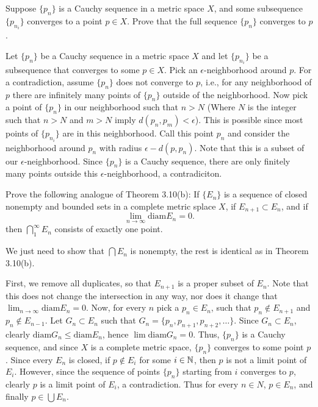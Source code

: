 \setcounter{problem}{19}
\begin{problem}
  Suppose $\{p_n\}$ is a Cauchy sequence in a metric space $X$, and some subsequence $\{p_{n_i}\}$ converges to a point $p \in X$.
  Prove that the full sequence $\{p_n\}$ converges to $p$.
\end{problem}

\begin{solution}
  Let $\{p_n\}$ be a Cauchy sequence in a metric space $X$ and let $\{p_{n_i}\}$ be a subsequence that converges to some $p \in X$.
  Pick an $\epsilon$-neighborhood around $p$.
  For a contradiction, assume $\{p_n\}$ does not converge to $p$, i.e., for any neighborhood of $p$ there are infinitely many points of $\{p_n\}$ outside of the neighborhood.
  Now pick a point of $\{p_{n}\}$ in our neighborhood such that $n > N$ (Where $N$ is the integer such that $n > N$ and $m > N$ imply $d(p_n, p_m) < \epsilon$).
  This is possible since most points of $\{p_{n_i}\}$ are in this neighborhood.
  Call this point $p_n$ and consider the neighborhood around $p_n$ with radius $\epsilon - d(p, p_n)$.
  Note that this is a subset of our $\epsilon$-neighborhood.
  Since $\{p_n\}$ is a Cauchy sequence, there are only finitely many points outside this $\epsilon$-neighborhood, a contradiciton.
\end{solution}

\begin{problem}
  Prove the following analogue of Theorem 3.10(b): If $\{E_n\}$ is a sequence of closed nonempty and bounded sets in a complete metric splace $X$, if $E_{n+1} \subset E_n$, and if 
  \[\lim_{n \to \infty} \text{diam} E_n = 0.\]
  then $\bigcap_1^{\infty} E_n$ consists of exactly one point.
\end{problem}

\begin{solution}
  We just need to show that $\bigcap E_n$ is nonempty, the rest is identical as in Theorem 3.10(b).

  First, we remove all duplicates, so that $E_{n + 1}$ is a proper subset of $E_n$.
  Note that this does not change the intersection in any way, nor does it change that $\lim_{n \to \infty} \text{diam} E_n = 0$.
  Now, for every $n$ pick a $p_n \in E_n$, such that $p_n \notin E_{n + 1}$ and $p_n \notin E_{n - 1}$.
  Let $G_n \subset E_n$ such that $G_n = \{p_n, p_{n + 1}, p_{n + 2}, \ldots\}$.
  Since $G_n \subset E_n$, clearly $\text{diam} G_n \le \text{diam} E_n$, hence $\lim \text{diam} G_n = 0$.
  Thus, $\{p_n\}$ is a Cauchy sequence, and since $X$ is a complete metric space, $\{p_n\}$ converges to some point $p$.
  Since every $E_n$ is closed, if $p \notin E_i$ for some $i \in \mathbb{N}$, then $p$ is not a limit point of $E_i$.
  However, since the sequence of points $\{p_n\}$ starting from $i$ converges to $p$, clearly $p$ is a limit point of $E_i$, a contradiction.
  Thus for every $n \in N$, $p \in E_n$, and finally $p \in \bigcup E_n$.
\end{solution}

